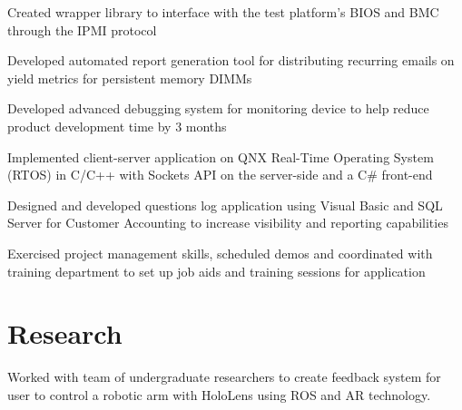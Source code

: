 \documentclass[]{deedy-resume-openfont}
\begin{document}
\begin{minipage}[t]{0.66\textwidth}
\begin{tightemize}
\item Created wrapper library to interface with the test platform’s BIOS and BMC through the IPMI protocol \item Developed automated report generation tool for distributing recurring emails on yield metrics for persistent memory DIMMs\end{tightemize}
\sectionsep

\begin{tightemize}
\item Developed advanced debugging system for monitoring device to help reduce product development time by 3 months\item Implemented client-server application on QNX Real-Time Operating System (RTOS) in C/C++ with Sockets API on the server-side and  a C\# front-end \end{tightemize}
\sectionsep

\begin{tightemize}
\item Designed and developed questions log application using Visual Basic and SQL Server for Customer Accounting to increase visibility and reporting capabilities \item	Exercised project management skills, scheduled demos and coordinated with training department to set up job aids and training sessions for application \end{tightemize}
\sectionsep


\section{Research}
\begin{tightemize}
\item Worked with team of undergraduate researchers to create feedback system for user to control a robotic arm with HoloLens using ROS and AR technology.
\end{tightemize}


\end{minipage}
\end{document}
